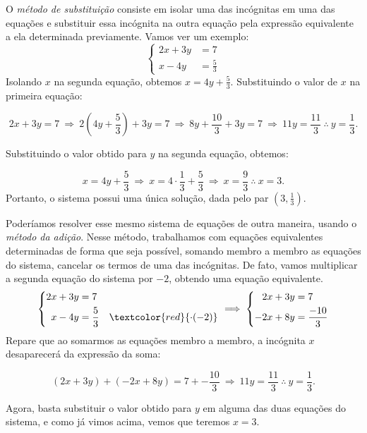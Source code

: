 O \emph{método de substituição} consiste em isolar uma das incógnitas em uma das equações e substituir essa incógnita na outra equação pela expressão equivalente a ela determinada previamente. Vamos ver um exemplo:
\begin{equation*}
\left\{
\begin{aligned}
2x+3y&=7\\
x-4y&=\frac{5}{3}
\end{aligned}
\right.
\end{equation*}
Isolando $x$ na segunda equação, obtemos $x = 4y + \frac{5}{3}$. Substituindo o valor de $x$ na primeira equação:

$$
2x+3y = 7 \ \Rightarrow \ 2(4y + \frac{5}{3}) + 3y = 7 \ \Rightarrow \ 8y + \frac{10}{3} + 3y = 7 \ \Rightarrow \ 11y = \frac{11}{3} \ \therefore \ y = \frac{1}{3}.
$$

Substituindo o valor obtido para $y$ na segunda equação, obtemos: 

$$
x = 4y + \frac{5}{3} \ \Rightarrow \ x = 4 \cdot \frac{1}{3} + \frac{5}{3} \ \Rightarrow \ x = \frac{9}{3} \ \therefore \ x = 3.
$$
Portanto, o sistema possui uma única solução, dada pelo par $(3, \frac{1}{3})$.

Poderíamos resolver esse mesmo sistema de equações de outra maneira, usando o \emph{método da adição}. Nesse método, trabalhamos com equações equivalentes determinadas de forma que seja possível, somando membro a membro as equações do sistema, cancelar os termos de uma das incógnitas. De fato, vamos multiplicar a segunda equação do sistema por $-2$, obtendo uma equação equivalente. 
\begin{equation*}
\left\{
\begin{aligned}
2x+3y&=7\\
x-4y&=\frac{5}{3} &\textcolor{red}{\cdot(-2)}
\end{aligned}
\right.
\implies
\left\{
\begin{aligned}
2x+3y&=7\\
-2x+8y&=\frac{-10}{3}
\end{aligned}
\right.
\end{equation*}
Repare que ao somarmos as equações membro a membro, a incógnita $x$ desaparecerá da expressão da soma:

$$
(2x + 3y) + (-2x + 8y) = 7 + -\frac{10}{3} \ \Rightarrow \ 11y = \frac{11}{3} \ \therefore \ y = \frac{1}{3}.
$$

Agora, basta substituir o valor obtido para $y$ em alguma das duas equações do sistema, e como já vimos acima, vemos que teremos $x = 3$.


